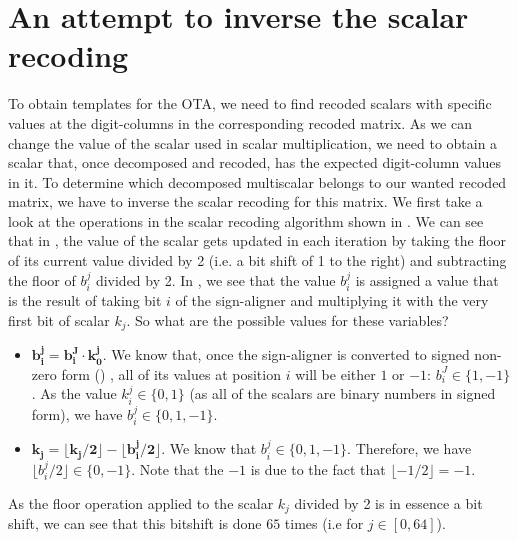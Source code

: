 \section{An attempt to inverse the scalar recoding} \label{sec: An attempt to inverse the scalar recoding}
To obtain templates for the OTA, we need to find recoded scalars with specific values at the digit-columns in the corresponding recoded matrix.
As we can change the value of the scalar used in {\fourqs} scalar multiplication, we need to obtain a scalar that, once decomposed and recoded, has the expected digit-column values in it.
To determine which decomposed multiscalar belongs to our wanted recoded matrix, we have to inverse the scalar recoding for this matrix.
We first take a look at the operations in the scalar recoding algorithm shown in .
We can see that in , the value of the scalar gets updated in each iteration by taking the floor of its current value divided by 2 (i.e. a bit shift of 1 to the right) and subtracting the floor of $b_i^j$ divided by 2.
In , we see that the value $b_i^j$ is assigned a value that is the result of taking bit $i$ of the sign-aligner and multiplying it with the very first bit of scalar $k_j$.
So what are the possible values for these variables?
%
\begin{itemize}
	\item $\bm{b_i^j = b_i^J \cdot k_0^j}$. We know that, once the sign-aligner is converted to signed non-zero form ()%
	, all of its values at position $i$ will be either $1$ or $-1$: $b_i^J \in \{1, -1\}$. As the value $k_i^j \in \{0, 1\}$ (as all of the scalars are binary numbers in signed form), we have $b_i^j \in \{0, 1, -1\}$.
	
	\item $\bm{k_j = \lfloor k_j / 2\rfloor - \lfloor b_i^j / 2 \rfloor}$. We know that $b_i^j \in \{0, 1, -1\}$. Therefore, we have $\lfloor b_i^j / 2 \rfloor \in \{0, -1\}$. Note that the $-1$ is due to the fact that $\lfloor -1 / 2 \rfloor = -1$.
\end{itemize}
%
As the floor operation applied to the scalar $k_j$ divided by 2 is in essence a bit shift, we can see that this bitshift is done $65$ times (i.e for $j \in [0, 64]$).

